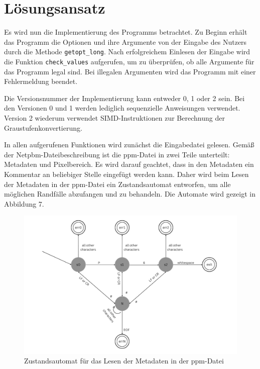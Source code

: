 \documentclass[course=erap]{aspdoc}
\begin{document}
\section{Lösungsansatz}

\par
Es wird nun die Implementierung des Programms betrachtet. Zu Beginn erhält das Programm die Optionen und ihre Argumente von der Eingabe des Nutzers durch die Methode \texttt{getopt\_long}\cite{getoptlong3}. Nach erfolgreichem Einlesen der Eingabe wird die Funktion \texttt{check\_values} aufgerufen, um zu überprüfen, ob alle Argumente für das Programm legal sind. Bei illegalen Argumenten wird das Programm mit einer Fehlermeldung beendet.

\par
Die Versionsnummer der Implementierung kann entweder 0, 1 oder 2 sein. Bei den Versionen 0 und 1 werden lediglich sequenzielle Anweisungen verwendet. Version 2 wiederum verwendet SIMD-Instruktionen zur Berechnung der Graustufenkonvertierung.

\par
In allen aufgerufenen Funktionen wird zunächst die Eingabedatei gelesen. Gemäß der Netpbm-Dateibeschreibung ist die ppm-Datei in zwei Teile unterteilt: Metadaten und Pixelbereich. Es wird darauf geachtet, dass in den Metadaten ein Kommentar an beliebiger Stelle eingefügt werden kann. Daher wird beim Lesen der Metadaten in der ppm-Datei ein Zustandsautomat entworfen, um alle möglichen Randfälle abzufangen und zu behandeln. Die Automate wird gezeigt in Abbildung 7.

\begin{figure}[h]
\centering
\includegraphics[width=1\textwidth]{Bilder/auto.png}
\caption{Zustandsautomat für das Lesen der Metadaten in der ppm-Datei}
\end{figure}
\end{document}
